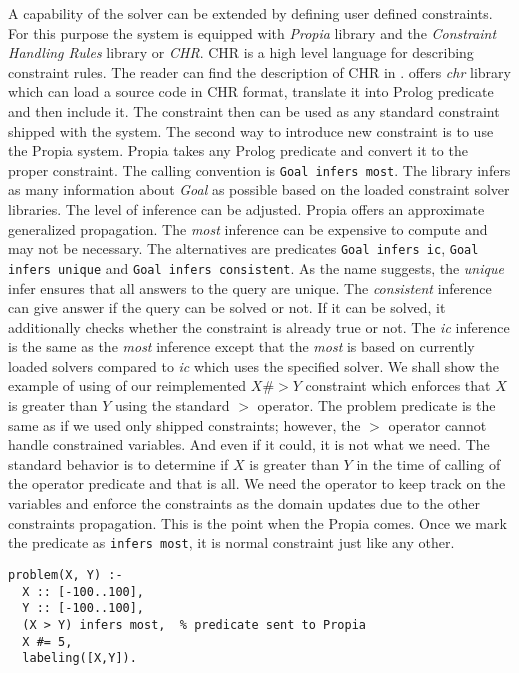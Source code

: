 A capability of the solver can be extended by defining user defined constraints. For this
purpose the system is equipped with {\em Propia} library and the {\em Constraint Handling Rules}
library or {\em CHR}. CHR is a high level language for describing constraint rules. The reader can find
the description of CHR in \cite{chr:website}.
\eclipse offers {\em chr} library which can load a source code in CHR format, translate it
into Prolog predicate and then include it. The constraint then can be used as any standard
constraint shipped with the system.
The second way to introduce new constraint is to use the Propia system. Propia takes 
any Prolog predicate and convert it to the proper constraint.
The calling convention is \texttt{Goal infers most}. The library infers as many information about {\em Goal} 
as possible based on the loaded constraint solver libraries. The level of inference can be adjusted.
Propia offers an approximate generalized propagation. The {\em most} inference can be expensive 
to compute and may not be necessary. The alternatives are predicates \texttt{Goal infers ic}, 
\texttt{Goal infers unique} and \texttt{Goal infers consistent}. As the name suggests, the {\em unique} 
infer ensures that all answers to the query are unique. The {\em consistent} inference can give
answer if the query can be solved or not. If it can be solved, it additionally checks whether the
constraint is already true or not. The {\em ic} inference is the same as the {\em most} inference except that
the {\em most} is based on currently loaded solvers compared to {\em ic} which uses the specified solver.
We shall show the example of using of our reimplemented $X \#> Y$ constraint which 
enforces that $X$ is greater than $Y$ using the standard $>$ operator. The problem predicate is the same 
as if we used only shipped constraints; however, the $>$ operator cannot handle constrained
variables. And even if it could, it is not what we need. The standard behavior is to 
determine if $X$ is greater than $Y$ in the time of calling of the operator predicate and
that is all. We need the operator to keep track on the variables and enforce the constraints
as the domain updates due to the other constraints propagation. This is the point when the Propia
comes. Once we mark the predicate as \texttt{infers most}, it is normal
constraint just like any other.

\begin{verbatim}
problem(X, Y) :-
  X :: [-100..100], 
  Y :: [-100..100], 
  (X > Y) infers most,  % predicate sent to Propia   
  X #= 5, 
  labeling([X,Y]).
\end{verbatim}

